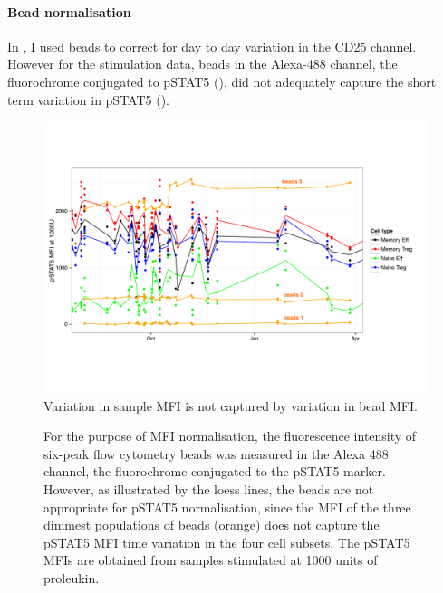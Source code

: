 \paragraph{Bead normalisation} 
In , I used beads to correct for day to day variation in the CD25 channel.
However for the stimulation data, beads in the Alexa-488 channel, the fluorochrome conjugated to pSTAT5 (),
did not adequately capture the short term variation in pSTAT5 ().  
\begin{figure}[h]
    \centering
    \includegraphics[scale=.6]{figures/pstat5-beads.pdf}
    {Variation in sample MFI is not captured by variation in bead MFI.}
    {
      For the purpose of MFI normalisation, the fluorescence intensity of six-peak flow cytometry beads
      was measured in the Alexa 488 channel, the fluorochrome conjugated to the pSTAT5 marker.
      However, as illustrated by the loess lines, the beads are not appropriate for pSTAT5 normalisation,
      since the MFI of the three dimmest populations of beads (orange)
      does not capture the pSTAT5 MFI time variation in the four cell subsets.
      The pSTAT5 MFIs are obtained from samples stimulated at 1000 units of proleukin.
      
    }
\end{figure} 


